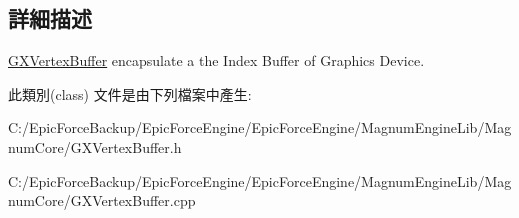 \subsection{詳細描述}
\hyperlink{class_magnum_1_1_g_x_vertex_buffer}{G\+X\+Vertex\+Buffer} encapsulate a the Index Buffer of Graphics Device. 

此類別(class) 文件是由下列檔案中產生\+:\begin{DoxyCompactItemize}
\item 
C\+:/\+Epic\+Force\+Backup/\+Epic\+Force\+Engine/\+Epic\+Force\+Engine/\+Magnum\+Engine\+Lib/\+Magnum\+Core/G\+X\+Vertex\+Buffer.\+h\item 
C\+:/\+Epic\+Force\+Backup/\+Epic\+Force\+Engine/\+Epic\+Force\+Engine/\+Magnum\+Engine\+Lib/\+Magnum\+Core/G\+X\+Vertex\+Buffer.\+cpp\end{DoxyCompactItemize}
